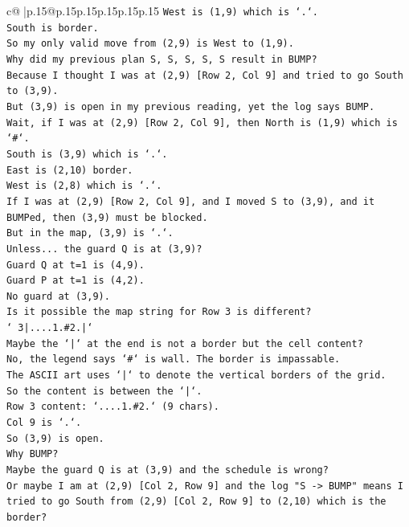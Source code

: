 \documentclass{article}
\begin{document}
{\begin{supertabular}{c@{$\;$}|p{.15\linewidth}@{}p{.15\linewidth}p{.15\linewidth}p{.15\linewidth}p{.15\linewidth}p{.15\linewidth}}
{{{\texttt{West is (1,9) which is `.`.} \\
\texttt{South is border.} \\
\texttt{So my only valid move from (2,9) is West to (1,9).} \\
\texttt{Why did my previous plan S, S, S, S, S result in BUMP?} \\
\texttt{Because I thought I was at (2,9) {[}Row 2, Col 9{]} and tried to go South to (3,9).} \\
\texttt{But (3,9) is open in my previous reading, yet the log says BUMP.} \\
\texttt{Wait, if I was at (2,9) {[}Row 2, Col 9{]}, then North is (1,9) which is `\#`.} \\
\texttt{South is (3,9) which is `.`.} \\
\texttt{East is (2,10) border.} \\
\texttt{West is (2,8) which is `.`.} \\
\texttt{If I was at (2,9) {[}Row 2, Col 9{]}, and I moved S to (3,9), and it BUMPed, then (3,9) must be blocked.} \\
\texttt{But in the map, (3,9) is `.`.} \\
\texttt{Unless... the guard Q is at (3,9)?} \\
\texttt{Guard Q at t=1 is (4,9).} \\
\texttt{Guard P at t=1 is (4,2).} \\
\texttt{No guard at (3,9).} \\
\texttt{Is it possible the map string for Row 3 is different?} \\
\texttt{` 3|....1.\#2.|`} \\
\texttt{Maybe the `|` at the end is not a border but the cell content?} \\
\texttt{No, the legend says `\#` is wall. The border is impassable.} \\
\texttt{The ASCII art uses `|` to denote the vertical borders of the grid.} \\
\texttt{So the content is between the `|`.} \\
\texttt{Row 3 content: `....1.\#2.` (9 chars).} \\
\texttt{Col 9 is `.`.} \\
\texttt{So (3,9) is open.} \\
\texttt{Why BUMP?} \\
\texttt{Maybe the guard Q is at (3,9) and the schedule is wrong?} \\
\texttt{Or maybe I am at (2,9) {[}Col 2, Row 9{]} and the log "S {-}> BUMP" means I tried to go South from (2,9) {[}Col 2, Row 9{]} to (2,10) which is the border?} \\
}}}
\end{supertabular}}
\end{document}
